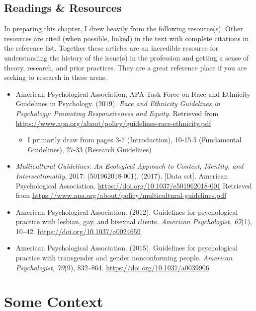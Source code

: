 \documentclass[
  english,
]{book}
\providecommand{\tightlist}{%
  \setlength{\itemsep}{0pt}\setlength{\parskip}{0pt}}
\begin{document}
\hypertarget{readings-resources-6}{%
\subsection{Readings \& Resources}\label{readings-resources-6}}

In preparing this chapter, I drew heavily from the following resource(s). Other resources are cited (when possible, linked) in the text with complete citations in the reference list. Together these articles are an incredible resource for understanding the history of the issue(s) in the profession and getting a sense of theory, research, and prior practices. They are a great reference place if you are seeking to research in these areas.

\begin{itemize}
\tightlist
\item
  American Psychological Association, APA Task Force on Race and Ethnicity Guidelines in Psychology. (2019). \emph{Race and Ethnicity Guidelines in Psychology: Promoting Responsiveness and Equity}. Retrieved from \url{https://www.apa.org/about/policy/guidelines-race-ethnicity.pdf}

  \begin{itemize}
  \tightlist
  \item
    I primarily draw from pages 3-7 (Introduction), 10-15.5 (Fundamental Guidelines), 27-33 (Research Guidelines)
  \end{itemize}
\item
  \emph{Multicultural Guidelines: An Ecological Approach to Context, Identity, and Intersectionality}, 2017: (501962018-001). (2017). {[}Data set{]}. American Psychological Association. \url{https://doi.org/10.1037/e501962018-001} Retrieved from \url{https://www.apa.org/about/policy/multicultural-guidelines.pdf}
\item
  American Psychological Association. (2012). Guidelines for psychological practice with lesbian, gay, and bisexual clients. \emph{American Psychologist, 67}(1), 10--42. \url{https://doi.org/10.1037/a0024659}
\item
  American Psychological Association. (2015). Guidelines for psychological practice with transgender and gender nonconforming people. \emph{American Psychologist, 70}(9), 832--864. \url{https://doi.org/10.1037/a0039906}
\end{itemize}

\hypertarget{some-context}{%
\section{Some Context}\label{some-context}}
\end{document}
